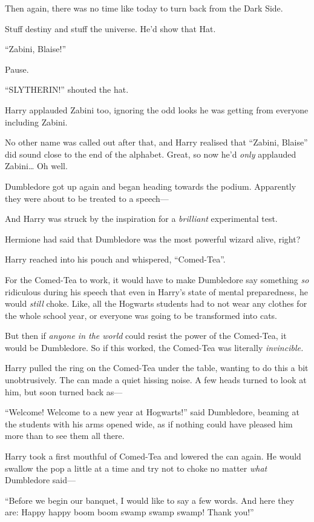 Then again, there was no time like today to turn back from the Dark
Side.

Stuff destiny and stuff the universe. He'd show that Hat.

``Zabini, Blaise!''

Pause.

``SLYTHERIN!'' shouted the hat.

Harry applauded Zabini too, ignoring the odd looks he was getting from
everyone including Zabini.

No other name was called out after that, and Harry realised that
``Zabini, Blaise'' did sound close to the end of the alphabet. Great, so
now he'd \emph{only} applauded Zabini\ldots{} Oh well.

Dumbledore got up again and began heading towards the podium. Apparently
they were about to be treated to a speech---

And Harry was struck by the inspiration for a \emph{brilliant}
experimental test.

Hermione had said that Dumbledore was the most powerful wizard alive,
right?

Harry reached into his pouch and whispered, ``Comed-Tea''.

For the Comed-Tea to work, it would have to make Dumbledore say
something \emph{so} ridiculous during his speech that even in Harry's
state of mental preparedness, he would \emph{still} choke. Like, all the
Hogwarts students had to not wear any clothes for the whole school year,
or everyone was going to be transformed into cats.

But then if \emph{anyone in the world} could resist the power of the
Comed-Tea, it would be Dumbledore. So if this worked, the Comed-Tea was
literally \emph{invincible.}

Harry pulled the ring on the Comed-Tea under the table, wanting to do
this a bit unobtrusively. The can made a quiet hissing noise. A few
heads turned to look at him, but soon turned back as---

``Welcome! Welcome to a new year at Hogwarts!'' said Dumbledore, beaming
at the students with his arms opened wide, as if nothing could have
pleased him more than to see them all there.

Harry took a first mouthful of Comed-Tea and lowered the can again. He
would swallow the pop a little at a time and try not to choke no matter
\emph{what} Dumbledore said---

``Before we begin our banquet, I would like to say a few words. And here
they are: Happy happy boom boom swamp swamp swamp! Thank you!''

